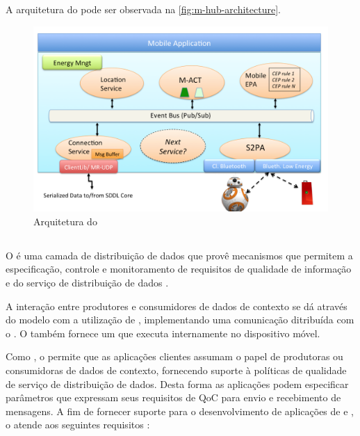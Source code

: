A arquitetura do \middleware pode ser observada na \autoref{fig:m-hub-architecture}.

\begin{figure}[htb]
	\centering
	\caption{\label{fig:m-hub-architecture}Arquitetura do \mhub}
	\includegraphics[scale=0.34]{img/m-hub-architecture.png}
\end{figure}

\subsection{\cddl}

O \cddl é uma camada de distribuição de dados que provê mecanismos que permitem a especificação, controle e monitoramento de requisitos de qualidade de informação e do serviço de distribuição de dados \cite{gomes:2017}.

A interação entre produtores e consumidores de dados de contexto se dá através do modelo \pubsub com a utilização de \brokers, implementando uma comunicação ditribuída com o \mqtt. O \cddl também fornece um \ubroker que executa internamente no dispositivo móvel.

Como \middleware, o \cddl permite que as aplicações clientes assumam o papel de produtoras ou consumidoras de dados de contexto, fornecendo suporte à políticas de qualidade de serviço de distribuição de dados. Desta forma as aplicações podem especificar parâmetros que expressam seus requisitos de QoC para envio e recebimento de mensagens. A fim de fornecer suporte para o desenvolvimento de aplicações de \iot e \iomt, o \cddl atende aos seguintes requisitos \cite{muniz:2017}:


